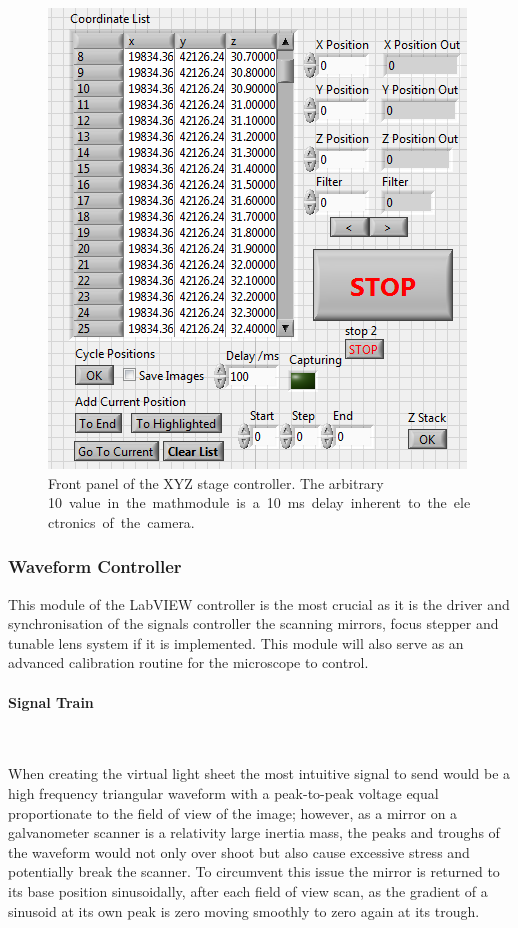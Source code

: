 \begin{figure}
\centering
\includegraphics[]{Figures/xyz_front}
\caption[XYZ Controller front panel]{Front panel of the XYZ stage controller.
The arbitrary \SI{10} value in the mathmodule is a \SI{10}{\milli\second} delay inherent to the electronics of the camera.}
\label{fig:xyz_front}
\end{figure}

\subsubsection{Waveform Controller}

This module of the LabVIEW controller is the most crucial as it is the driver and synchronisation of the signals controller the scanning mirrors, focus stepper and tunable lens system if it is implemented.
This module will also serve as an advanced calibration routine for the microscope to control.

\paragraph{Signal Train}~

When creating the virtual light sheet the most intuitive signal to send would be a high frequency triangular waveform with a peak-to-peak voltage equal proportionate to the field of view of the image; however, as a mirror on a galvanometer scanner is a relativity large inertia mass, the peaks and troughs of the waveform would not only over shoot but also cause excessive stress and potentially break the scanner.
To circumvent this issue the mirror is returned to its base position sinusoidally, after each field of view scan, as the gradient of a sinusoid at its own peak is zero moving smoothly to zero again at its trough.

